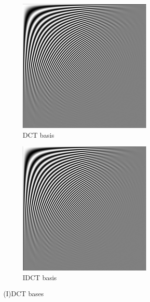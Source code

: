 \documentclass[12pt,english]{article}
\begin{document}
\begin{figure}
	\centering
	\begin{subfigure}[t]{0.4\textwidth}
		\centering
		\includegraphics[width=.9\textwidth]{img/DCT_vectors}
		\caption{DCT basis}
		\label{fig:dct}
	\end{subfigure}%
	\qquad%
	\begin{subfigure}[t]{0.4\textwidth}
		\centering
		\includegraphics[width=.9\textwidth]{img/IDCT_vectors}
		\caption{IDCT basis}
		\label{fig:idct}
	\end{subfigure}
	\caption{(I)DCT bases}
	\label{fig:iddct}
\end{figure}
\end{document}
